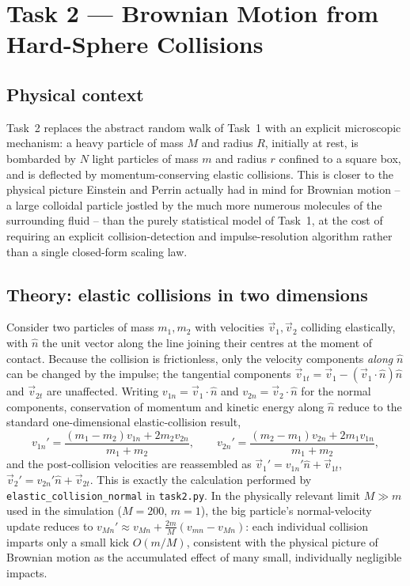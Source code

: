 \documentclass[11pt]{article}
\begin{document}
\section{Task 2 --- Brownian Motion from Hard-Sphere Collisions}
\label{sec:task2}

\subsection{Physical context}
Task~2 replaces the abstract random walk of Task~1 with an explicit microscopic mechanism: a heavy particle of mass $M$ and radius $R$, initially at rest, is bombarded by $N$ light particles of mass $m$ and radius $r$ confined to a square box, and is deflected by momentum-conserving elastic collisions. This is closer to the physical picture Einstein and Perrin actually had in mind for Brownian motion -- a large colloidal particle jostled by the much more numerous molecules of the surrounding fluid -- than the purely statistical model of Task~1, at the cost of requiring an explicit collision-detection and impulse-resolution algorithm rather than a single closed-form scaling law.

\subsection{Theory: elastic collisions in two dimensions}
Consider two particles of mass $m_1, m_2$ with velocities $\vec v_1,\vec v_2$ colliding elastically, with $\hat n$ the unit vector along the line joining their centres at the moment of contact. Because the collision is frictionless, only the velocity components \emph{along} $\hat n$ can be changed by the impulse; the tangential components $\vec v_{1t} = \vec v_1 - (\vec v_1\cdot\hat n)\hat n$ and $\vec v_{2t}$ are unaffected. Writing $v_{1n} = \vec v_1\cdot \hat n$ and $v_{2n}=\vec v_2\cdot\hat n$ for the normal components, conservation of momentum and kinetic energy along $\hat n$ reduce to the standard one-dimensional elastic-collision result,
\begin{equation}
v_{1n}' = \frac{(m_1-m_2)v_{1n} + 2m_2 v_{2n}}{m_1+m_2}, \qquad
v_{2n}' = \frac{(m_2-m_1)v_{2n} + 2m_1 v_{1n}}{m_1+m_2},
\end{equation}
and the post-collision velocities are reassembled as $\vec v_1' = v_{1n}'\hat n + \vec v_{1t}$, $\vec v_2' = v_{2n}'\hat n + \vec v_{2t}$. This is exactly the calculation performed by \texttt{elastic\_collision\_normal} in \texttt{task2.py}. In the physically relevant limit $M \gg m$ used in the simulation ($M=200$, $m=1$), the big particle's normal-velocity update reduces to $v_{Mn}' \approx v_{Mn} + \tfrac{2m}{M}(v_{mn}-v_{Mn})$: each individual collision imparts only a small kick $O(m/M)$, consistent with the physical picture of Brownian motion as the accumulated effect of many small, individually negligible impacts.
\end{document}
